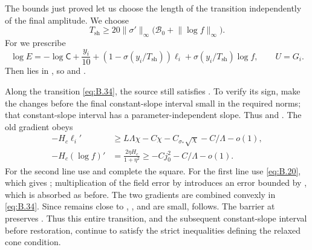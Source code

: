 The bounds just proved let us choose the length of the transition independently of the
final amplitude. We choose
\begin{equation}
  T_{\mathrm{sh}}\geq20\lVert\sigma'\rVert_\infty
  \bigl(\mathcal B_0+\lVert\log f\rVert_\infty\bigr).
\tag{B.33}\label{eq:B.33}
\end{equation}
For  we prescribe
\begin{equation}
  \log E=-\log\mathsf C+\frac{y_i}{10}
  +(1-\sigma(y_i/T_{\mathrm{sh}}))\ell_i
  +\sigma(y_i/T_{\mathrm{sh}})\log f,
  \qquad U=G_i.
\tag{B.34}\label{eq:B.34}
\end{equation}
Then  lies in
, so  and
.

Along the transition \eqref{eq:B.34}, the source still satisfies . To verify its sign, make the
changes before the final  constant-slope interval small in the required
 norms; that constant-slope interval has a parameter-independent slope. Thus
%
%
 and
. The old gradient obeys
\[
\begin{aligned}
  -H_c\ell_i'&\geq L\Lambda\chi-C\chi-C_{\sigma_*}\sqrt\chi-C/\Lambda-o(1),\\
  -H_c(\log f)'&=\frac{2\eta H_c}{1+\eta^2}\geq-Cj_0^2-C/\Lambda-o(1).
\end{aligned}
\]
For the second line use  and complete the square. For the first line
use \eqref{eq:B.20}, which gives
; multiplication of the
 field error by  introduces an error bounded by
, which is absorbed as before. The two gradients are combined convexly in
\eqref{eq:B.34}. Since  remains close to
, , and
 are small,  follows. The barrier
 at  preserves
. Thus this entire transition, and the subsequent constant-slope interval before
restoration, continue to satisfy the strict inequalities defining the relaxed cone condition.

